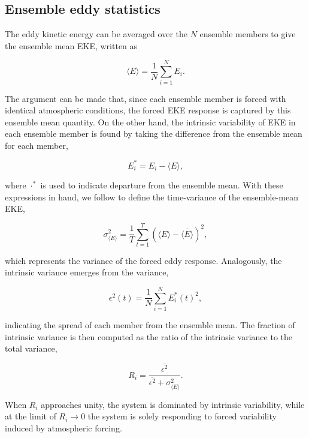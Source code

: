 \documentclass[linenumbers]{agujournal2019}
\begin{document}
\subsection{Ensemble eddy statistics}

The eddy kinetic energy can be averaged over the $N$ ensemble members to give the ensemble mean EKE, written as
\begin{linenomath*}
\begin{equation}
\langle E \rangle = \frac{1}{N} \sum_{i=1}^N E_i.
\end{equation}
\end{linenomath*}
The argument can be made that, since each ensemble member is forced with identical atmospheric conditions, the forced EKE response is captured by this ensemble mean quantity.
On the other hand, the intrinsic variability of EKE in each ensemble member is found by taking the difference from the ensemble mean for each member,
\begin{linenomath*}
\begin{equation}
E_i^* = E_i - \langle E \rangle,
\end{equation}
\end{linenomath*}
where $\cdot^*$ is used to indicate departure from the ensemble mean.
With these expressions in hand, we follow \citet{Leroux2018} to define the  time-variance of the ensemble-mean EKE,
\begin{linenomath*}
\begin{equation}
\sigma^2_{\langle E \rangle} = \frac{1}{T} \sum_{t=1}^T \left(\langle E \rangle -  \overline{\langle E \rangle}\right)^2,
\end{equation}
\end{linenomath*}
which represents the variance of the forced eddy response.
Analogously, the intrinsic variance emerges from the variance,
\begin{linenomath*}
\begin{equation}
\epsilon^2(t) = \frac{1}{N} \sum_{i=1}^N E_i^*(t)^2,
\end{equation}
\end{linenomath*}
indicating the spread of each member from the ensemble mean.
The fraction of intrinsic variance is then computed as the ratio of the intrinsic variance to the total variance,
\begin{linenomath*}
\begin{equation}
R_i =  \frac{\overline{\epsilon^2}}{\overline{\epsilon^2} + \sigma^2_{\langle E \rangle}}.
\end{equation}
\end{linenomath*}
When $R_i$ approaches unity, the system is dominated by intrinsic variability, while at the limit  of $R_i \to 0$ the system is solely responding to forced variability induced by atmospheric forcing.
\end{document}
